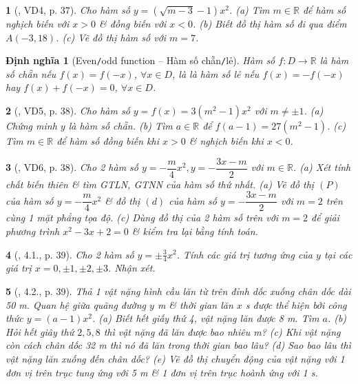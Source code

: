 \documentclass{article}
\newtheorem{baitoan}{}
\newtheorem{dinhnghia}{Định nghĩa}
\begin{document}
\begin{baitoan}[\cite{Binh_boi_duong_Toan_9_tap_2}, VD4, p. 37]
	Cho hàm số $y = (\sqrt{m - 3} - 1)x^2$. (a) Tìm $m\in\mathbb{R}$ để hàm số nghịch biến với $x > 0$ \& đồng biến với $x < 0$. (b) Biết đồ thị hàm số đi qua điểm $A(-3,18)$. (c) Vẽ đồ thị hàm số với $m = 7$.
\end{baitoan}

\begin{dinhnghia}[Even{\tt/}odd function -- Hàm số chẵn{\tt/}lẻ]
	Hàm số $f:D\to\mathbb{R}$ là {\rm hàm số chẵn} nếu $f(x) = f(-x)$, $\forall x\in D$, là là {\rm hàm số lẻ} nếu $f(x) = -f(-x)$ hay $f(x) + f(-x) = 0$, $\forall x\in D$.
\end{dinhnghia}

\begin{baitoan}[\cite{Binh_boi_duong_Toan_9_tap_2}, VD5, p. 38]
	Cho hàm số $y = f(x) = 3(m^2 - 1)x^2$ với $m\ne\pm1$. (a) Chứng minh $y$ là hàm số chẵn. (b) Tìm $a\in\mathbb{R}$ để $f(a - 1) = 27(m^2 - 1)$. (c) Tìm $m\in\mathbb{R}$ để hàm số đồng biến khi $x > 0$ \& nghịch biến khi $x < 0$.
\end{baitoan}

\begin{baitoan}[\cite{Binh_boi_duong_Toan_9_tap_2}, VD6, p. 38]
	Cho 2 hàm số $y = -\dfrac{m}{4}x^2,y = -\dfrac{3x - m}{2}$ với $m\in\mathbb{R}$. (a) Xét tính chất biến thiên \& tìm {\rm GTLN, GTNN} của hàm số thứ nhất. (a) Vẽ đồ thị $(P)$ của hàm số $y = -\dfrac{m}{4}x^2$ \& đồ thị $(d)$ của hàm số $y = -\dfrac{3x - m}{2}$ với $m = 2$ trên cùng 1 mặt phẳng tọa độ. (c) Dùng đồ thị của 2 hàm số trên với $m = 2$ để giải phương trình $x^2 - 3x + 2 = 0$ \& kiểm tra lại bằng tính toán.
\end{baitoan}

\begin{baitoan}[\cite{Binh_boi_duong_Toan_9_tap_2}, 4.1., p. 39]
	Cho 2 hàm số $y = \pm\frac{3}{4}x^2$. Tính các giá trị tương ứng của $y$ tại các giá trị $x = 0,\pm1,\pm2,\pm3$. Nhận xét.
\end{baitoan}

\begin{baitoan}[\cite{Binh_boi_duong_Toan_9_tap_2}, 4.2., p. 39]
	Thả 1 vật nặng hình cầu lăn từ trên đỉnh dốc xuống chân dốc dài {\rm50 m}. Quan hệ giữa quãng đường $y$ {\rm m} \& thời gian lăn $x$ {\rm s} được thể hiện bởi công thức $y = (a - 1)x^2$. (a) Biết hết giấy thứ 4, vật nặng lăn được {\rm8 m}. Tìm $a$. (b) Hỏi hết giây thứ $2,5,8$ thì vật nặng đã lăn được bao nhiêu {\rm m}? (c) Khi vật nặng còn cách chân dốc {\rm32 m} thì nó đã lăn trong thời gian bao lâu? (d) Sao bao lâu thì vật nặng lăn xuống đến chân dốc? (e) Vẽ đồ thị chuyển động của vật nặng với 1 đơn vị trên trục tung ứng với {\rm5 m} \& 1 đơn vị trên trục hoành ứng với {\rm1 s}.
\end{baitoan}
\end{document}
